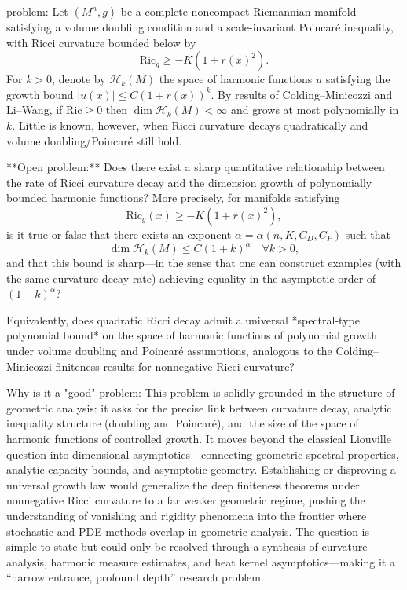 problem:  
Let \((M^n,g)\) be a complete noncompact Riemannian manifold satisfying a volume doubling condition and a scale-invariant Poincaré inequality, with Ricci curvature bounded below by  
\[
\mathrm{Ric}_g \ge -K(1+r(x)^2).
\]  
For \(k>0\), denote by \( \mathcal{H}_k(M)\) the space of harmonic functions \(u\) satisfying the growth bound \(|u(x)| \le C(1+r(x))^k\).  By results of Colding–Minicozzi and Li–Wang, if \(\mathrm{Ric}\ge0\) then \(\dim \mathcal{H}_k(M) < \infty\) and grows at most polynomially in \(k\). Little is known, however, when Ricci curvature decays quadratically and volume doubling/Poincaré still hold.

**Open problem:**  
Does there exist a sharp quantitative relationship between the rate of Ricci curvature decay and the dimension growth of polynomially bounded harmonic functions?  
More precisely, for manifolds satisfying  
\[
\mathrm{Ric}_g(x) \ge -K(1+r(x)^2),
\]
is it true or false that there exists an exponent \(\alpha=\alpha(n,K,C_D,C_P)\) such that  
\[
\dim \mathcal{H}_k(M) \le C(1+k)^\alpha \quad \forall k>0,
\]
and that this bound is sharp—in the sense that one can construct examples (with the same curvature decay rate) achieving equality in the asymptotic order of \((1+k)^{\alpha}\)?  

Equivalently, does quadratic Ricci decay admit a universal *spectral-type polynomial bound* on the space of harmonic functions of polynomial growth under volume doubling and Poincaré assumptions, analogous to the Colding–Minicozzi finiteness results for nonnegative Ricci curvature?  

Why is it a "good" problem:  
This problem is solidly grounded in the structure of geometric analysis: it asks for the precise link between curvature decay, analytic inequality structure (doubling and Poincaré), and the size of the space of harmonic functions of controlled growth. It moves beyond the classical Liouville question into dimensional asymptotics—connecting geometric spectral properties, analytic capacity bounds, and asymptotic geometry. Establishing or disproving a universal growth law would generalize the deep finiteness theorems under nonnegative Ricci curvature to a far weaker geometric regime, pushing the understanding of vanishing and rigidity phenomena into the frontier where stochastic and PDE methods overlap in geometric analysis. The question is simple to state but could only be resolved through a synthesis of curvature analysis, harmonic measure estimates, and heat kernel asymptotics—making it a “narrow entrance, profound depth” research problem.